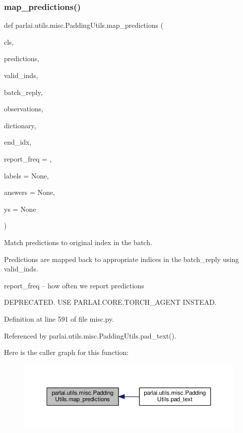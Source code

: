 \subsubsection{\texorpdfstring{map\+\_\+predictions()}{map\_predictions()}}
{\footnotesize\ttfamily def parlai.\+utils.\+misc.\+Padding\+Utils.\+map\+\_\+predictions (\begin{DoxyParamCaption}\item[{}]{cls,  }\item[{}]{predictions,  }\item[{}]{valid\+\_\+inds,  }\item[{}]{batch\+\_\+reply,  }\item[{}]{observations,  }\item[{}]{dictionary,  }\item[{}]{end\+\_\+idx,  }\item[{}]{report\+\_\+freq = {},  }\item[{}]{labels = {\ttfamily None},  }\item[{}]{answers = {\ttfamily None},  }\item[{}]{ys = {\ttfamily None} }\end{DoxyParamCaption})}

\begin{DoxyVerb}Match predictions to original index in the batch.

Predictions are mapped back to appropriate indices in the batch_reply
using valid_inds.

report_freq -- how often we report predictions

DEPRECATED. USE PARLAI.CORE.TORCH_AGENT INSTEAD.
\end{DoxyVerb}
 

Definition at line 591 of file misc.\+py.



Referenced by parlai.\+utils.\+misc.\+Padding\+Utils.\+pad\+\_\+text().

Here is the caller graph for this function\+:
\nopagebreak
\begin{figure}[H]
\begin{center}
\leavevmode
\includegraphics[width=350pt]{classparlai_1_1utils_1_1misc_1_1PaddingUtils_ae862960e8f261ff4088d5dedbe42a25c_icgraph}
\end{center}
\end{figure}
\mbox{\label{classparlai_1_1utils_1_1misc_1_1PaddingUtils_acd7178452139c55dc56e9889b10347cc}} 
